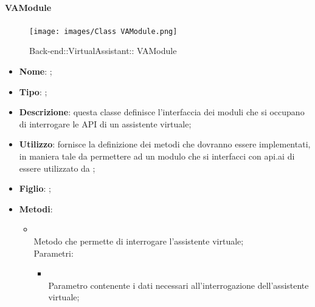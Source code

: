 \hypertarget{ VAModule_label}{\paragraph{ VAModule}}
\begin{figure}[h]
	\centering
	\texttt{[image: images/Class VAModule.png]}
	\caption{Back-end::VirtualAssistant:: VAModule}
\end{figure}
\begin{itemize}
	\item \textbf{Nome}: ;
	\item \textbf{Tipo}: ;
	\item \textbf{Descrizione}: questa classe definisce l'interfaccia dei moduli che si occupano di interrogare le API di un assistente virtuale;
	\item \textbf{Utilizzo}: fornisce la definizione dei metodi che dovranno essere implementati, in maniera tale da permettere ad un modulo che si interfacci con api.ai di essere utilizzato da ;
	\item \textbf{Figlio}: ;
	\item \textbf{Metodi}:
	\begin{itemize}
		\item[]  \\
		Metodo che permette di interrogare l'assistente virtuale;\\
		Parametri:
		\begin{itemize}
			\item {} \\
			Parametro contenente i dati necessari all'interrogazione dell'assistente virtuale;
		\end{itemize}
	\end{itemize}
\end{itemize}
\FloatBarrier

